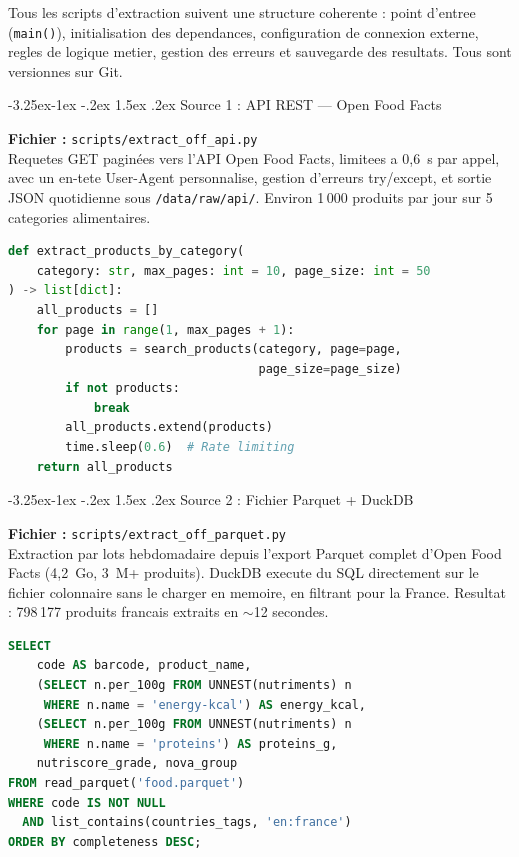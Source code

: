 \documentclass[a4paper,11pt,oneside,openany]{report}
\makeatletter
\renewcommand\subsection{\@startsection{subsection}{2}{\z@}%
  {-3.25ex\@plus -1ex \@minus -.2ex}%
  {1.5ex \@plus .2ex}%
  {\normalfont\large\bfseries\color{ntdarkgreen}}}
\makeatother
\begin{document}
Tous les scripts d'extraction suivent une structure coherente : point
d'entree (\texttt{main()}), initialisation des dependances,
configuration de connexion externe, regles de logique metier, gestion
des erreurs et sauvegarde des resultats. Tous sont versionnes sur Git.

\subsection{Source 1 : API REST --- Open Food Facts}

\textbf{Fichier :} \texttt{scripts/extract\_off\_api.py}\\
Requetes GET paginées vers l'API Open Food Facts, limitees a 0,6~s
par appel, avec un en-tete User-Agent personnalise, gestion d'erreurs
try/except, et sortie JSON quotidienne sous \texttt{/data/raw/api/}.
Environ 1\,000 produits par jour sur 5 categories alimentaires.

\begin{lstlisting}[language=Python, caption={Extraction API REST --- Open Food Facts}]
def extract_products_by_category(
    category: str, max_pages: int = 10, page_size: int = 50
) -> list[dict]:
    all_products = []
    for page in range(1, max_pages + 1):
        products = search_products(category, page=page,
                                   page_size=page_size)
        if not products:
            break
        all_products.extend(products)
        time.sleep(0.6)  # Rate limiting
    return all_products
\end{lstlisting}

\subsection{Source 2 : Fichier Parquet + DuckDB}

\textbf{Fichier :} \texttt{scripts/extract\_off\_parquet.py}\\
Extraction par lots hebdomadaire depuis l'export Parquet complet
d'Open Food Facts (4,2~Go, 3~M+ produits). DuckDB execute du SQL
directement sur le fichier colonnaire sans le charger en memoire, en
filtrant pour la France. Resultat : 798\,177 produits francais
extraits en $\sim$12 secondes.

\begin{lstlisting}[language=SQL, caption={Requete DuckDB --- Extraction Parquet avec structures imbriquees}]
SELECT
    code AS barcode, product_name,
    (SELECT n.per_100g FROM UNNEST(nutriments) n
     WHERE n.name = 'energy-kcal') AS energy_kcal,
    (SELECT n.per_100g FROM UNNEST(nutriments) n
     WHERE n.name = 'proteins') AS proteins_g,
    nutriscore_grade, nova_group
FROM read_parquet('food.parquet')
WHERE code IS NOT NULL
  AND list_contains(countries_tags, 'en:france')
ORDER BY completeness DESC;
\end{lstlisting}
\end{document}
